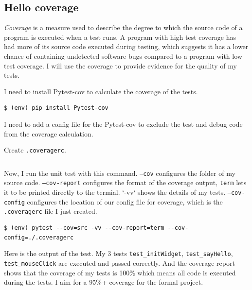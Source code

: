 \documentclass[a4paper]{report}
\begin{document}
\subsection{Hello coverage}

\emph{Coverage} is a measure used to describe the degree to which the source code of a program is executed when a test runs. A program with high test coverage has had more of its source code executed during testing, which suggests it has a lower chance of containing undetected software bugs compared to a program with low test coverage. I will use the coverage to provide evidence for the quality of my tests.

I need to install Pytest-cov to calculate the coverage of the tests.

\begin{verbatim}
$ (env) pip install Pytest-cov
\end{verbatim}

I need to add a config file for the Pytest-cov to exclude the test and debug code from the coverage calculation.

Create \texttt{.coveragerc}.

\inputminted{text}{../.coveragerc}

Now, I run the unit test with this command. \texttt{--cov} configures the folder of my source code. \texttt{--cov-report} configures the format of the coverage output, \texttt{term} lets it to be printed directly to the termial. `-vv` shows the details of my tests. \texttt{--cov-config} configures the location of our config file for coverage, which is the \texttt{.coveragerc} file I just created.

\begin{verbatim}
$ (env) pytest --cov=src -vv --cov-report=term --cov-config=./.coveragerc
\end{verbatim}

Here is the output of the test. My 3 tests \texttt{test_initWidget}, \texttt{test_sayHello}, \texttt{test_mouseClick} are executed and passed correctly. And the coverage report shows that the coverage of my tests is 100\% which means all code is executed during the tests. I aim for a 95\%+ coverage for the formal project.
\end{document}
